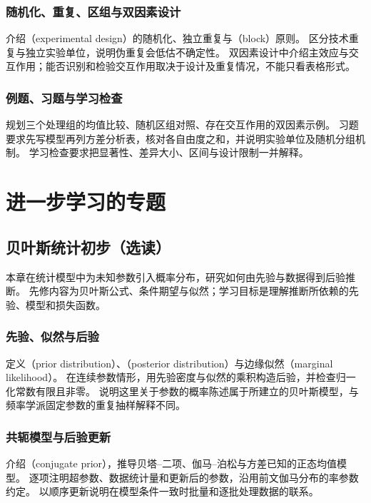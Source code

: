 \documentclass[UTF8,12pt,a4paper,fontset=fandol]{ctexbook}
\begin{document}
\section{随机化、重复、区组与双因素设计}
\label{sec:ps-experimental-design}
介绍（experimental design）的随机化、独立重复与（block）原则。
区分技术重复与独立实验单位，说明伪重复会低估不确定性。
双因素设计中介绍主效应与交互作用；能否识别和检验交互作用取决于设计及重复情况，不能只看表格形式。

\section{例题、习题与学习检查}
规划三个处理组的均值比较、随机区组对照、存在交互作用的双因素示例。
习题要求先写模型再列方差分析表，核对各自由度之和，并说明实验单位及随机分组机制。
学习检查要求把显著性、差异大小、区间与设计限制一并解释。


\part{进一步学习的专题}

\chapter{贝叶斯统计初步（选读）}
\label{chap:ps-bayesian}

本章在统计模型中为未知参数引入概率分布，研究如何由先验与数据得到后验推断。
先修内容为贝叶斯公式、条件期望与似然；学习目标是理解推断所依赖的先验、模型和损失函数。

\section{先验、似然与后验}
\label{sec:ps-bayesian-model}
定义（prior distribution）、（posterior distribution）与边缘似然（marginal likelihood）。
在连续参数情形，用先验密度与似然的乘积构造后验，并检查归一化常数有限且非零。
说明这里关于参数的概率陈述属于所建立的贝叶斯模型，与频率学派固定参数的重复抽样解释不同。

\section{共轭模型与后验更新}
\label{sec:ps-conjugate-priors}
介绍（conjugate prior），推导贝塔--二项、伽马--泊松与方差已知的正态均值模型。
逐项注明超参数、数据统计量和更新后的参数，沿用前文伽马分布的率参数约定。
以顺序更新说明在模型条件一致时批量和逐批处理数据的联系。
\end{document}
